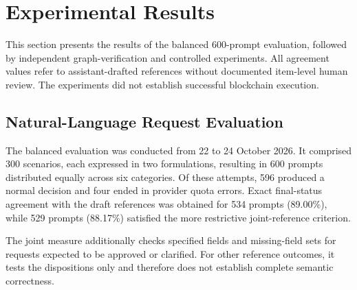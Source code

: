 
\section{Experimental Results}
\label{sec:experimental_results}


This section presents the results of the balanced 600-prompt
evaluation, followed by independent graph-verification and
controlled experiments. All agreement values refer to
assistant-drafted references without documented item-level
human review. The experiments did not establish successful
blockchain execution.

\subsection{Natural-Language Request Evaluation}
\label{sec:results_balanced}


The balanced evaluation was conducted from 22 to 24 October 2026.
It comprised 300 scenarios, each expressed in two formulations,
resulting in 600 prompts distributed equally across six categories.
Of these attempts, 596 produced a normal decision and four ended
in provider quota errors. Exact final-status agreement with the
draft references was obtained for 534 prompts (89.00\%), while
529 prompts (88.17\%) satisfied the more restrictive joint-reference
criterion.

The joint measure additionally checks specified fields and missing-field sets
for requests expected to be approved or clarified. For other reference
outcomes, it tests the dispositions only and therefore does not establish
complete semantic correctness.

